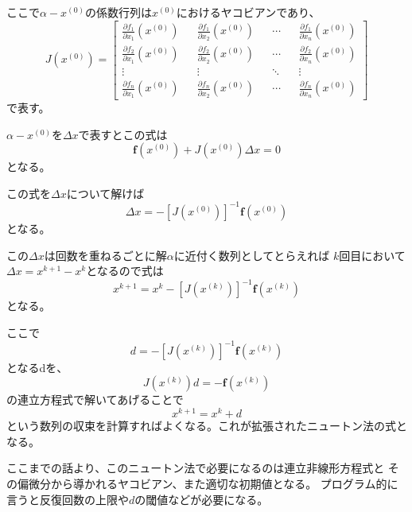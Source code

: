 \documentclass[a4paper,11pt]{jsarticle}
\begin{document}
ここで$\alpha - x^{(0)}$の係数行列は$x^{(0)}$におけるヤコビアンであり、
\begin{equation*}
    J(x^{(0)}) = 
    \begin{bmatrix}
        \frac{\partial f_1}{\partial x_1}(x^{(0)}) && \frac{\partial f_1}{\partial x_2}(x^{(0)}) && \cdots && \frac{\partial f_1}{\partial x_n}(x^{(0)}) \\
        \frac{\partial f_2}{\partial x_1}(x^{(0)}) && \frac{\partial f_2}{\partial x_2}(x^{(0)}) && \cdots && \frac{\partial f_2}{\partial x_n}(x^{(0)}) \\
        \vdots && \vdots && \ddots && \vdots \\
        \frac{\partial f_n}{\partial x_1}(x^{(0)}) && \frac{\partial f_n}{\partial x_2}(x^{(0)}) && \cdots && \frac{\partial f_n}{\partial x_n}(x^{(0)}) 
    \end{bmatrix}
\end{equation*}
で表す。

$\alpha - x^{(0)}$を$\Delta x$で表すとこの式は
\begin{equation*}
    \textbf{f}(x^{(0)}) + J(x^{(0)}) \Delta x = 0
\end{equation*}
となる。

この式を$\Delta x$について解けば
\begin{equation*}
    \Delta x = -[J(x^{(0)})]^{-1} \textbf{f}(x^{(0)})
\end{equation*}
となる。

この$\Delta x$は回数を重ねるごとに解$\alpha$に近付く数列としてとらえれば
$k$回目において$\Delta x = x^{k+1} - x^k$となるので式は
\begin{equation*}
    x^{k+1} = x^k -[J(x^{(k)})]^{-1} \textbf{f}(x^{(k)})
\end{equation*}
となる。

ここで
\begin{equation*}
    d = -[J(x^{(k)})]^{-1} \textbf{f}(x^{(k)})
\end{equation*}
となるdを、
\begin{equation*}
    J(x^{(k)})d = -\textbf{f}(x^{(k)})
\end{equation*}
の連立方程式で解いてあげることで
\begin{equation*}
    x^{k+1} = x^k + d
\end{equation*}
という数列の収束を計算すればよくなる。これが拡張されたニュートン法の式となる。

ここまでの話より、このニュートン法で必要になるのは連立非線形方程式と
その偏微分から導かれるヤコビアン、また適切な初期値となる。
プログラム的に言うと反復回数の上限や$d$の閾値などが必要になる。
\end{document}
